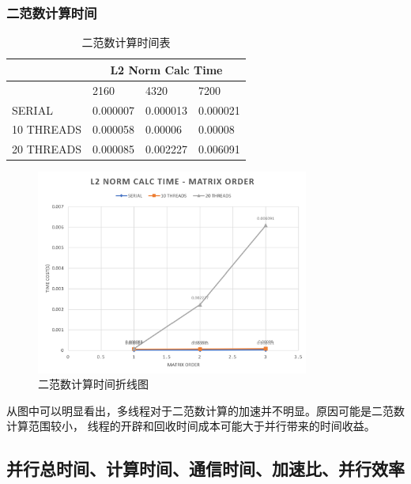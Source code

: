 \documentclass[UTF8]{article}
\begin{document}
\subsubsection{二范数计算时间}

        \begin{table}[h]
            \caption{二范数计算时间表}
            \label{tab:my-table}
            \centering
            \begin{tabular}{|l|l|l|l|}
            \hline
                       & \multicolumn{3}{c|}{L2 Norm Calc Time} \\ \hline
                       & 2160        & 4320        & 7200       \\ \hline
            SERIAL     & 0.000007    & 0.000013    & 0.000021   \\ \hline
            10 THREADS & 0.000058    & 0.00006     & 0.00008    \\ \hline
            20 THREADS & 0.000085    & 0.002227    & 0.006091   \\ \hline
            \end{tabular}
            \end{table}
            \begin{figure}[h]
                \label{Ratio}
                \centering
                    \includegraphics[width=0.8\textwidth]{lct.png}
                    \caption{二范数计算时间折线图}
                \end{figure}
从图中可以明显看出，多线程对于二范数计算的加速并不明显。原因可能是二范数计算范围较小，
线程的开辟和回收时间成本可能大于并行带来的时间收益。
\clearpage
\subsection{并行总时间、计算时间、通信时间、加速比、并行效率}
\end{document}
